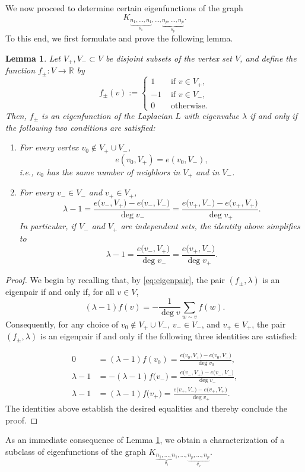 \documentclass{article}
\theoremstyle{plain}
\newtheorem{lemma}[theorem]{Lemma}
\theoremstyle{definition}
\theoremstyle{remark}
\begin{document}
We now proceed to determine certain eigenfunctions of the graph
\[
K_{\underbrace{n_1, \ldots, n_1}_{\theta_1}, \ldots, \underbrace{n_p, \ldots, n_p}_{\theta_p}}.
\]
To this end, we first formulate and prove the following lemma.

\begin{lemma}\label{lem:plusminus}
Let $V_+,V_-\subset V$ be disjoint subsets of the vertex set $V$, and define the function $f_{\pm}:V\to\mathbb{R}$ by
\[
    f_{\pm}(v) := \begin{cases}
        1 &\text{ if } v\in V_+,\\
        -1 &\text{ if } v\in V_-,\\
        0 &\text{ otherwise.}
    \end{cases}
\]
Then, $f_{\pm}$ is an eigenfunction of the Laplacian $L$ with eigenvalue $\lambda$ if and only if the following two conditions are satisfied:
\begin{enumerate}
    \item For every vertex $v_0\notin V_+\cup V_-$,
    \[
        e(v_0,V_+) = e(v_0,V_-),
    \]
    i.e., $v_0$ has the same number of neighbors in $V_+$ and in $V_-$.
    \item For every $v_-\in V_-$ and $v_+\in V_+$,
    \[
        \lambda-1
        = \frac{e\bigl(v_-,V_+\bigr)-e\bigl(v_-,V_-\bigr)}{\deg v_-}
        = \frac{e\bigl(v_+,V_-\bigr)-e\bigl(v_+,V_+\bigr)}{\deg v_+}.
    \]
    In particular, if $V_-$ and $V_+$ are independent sets, the identity above simplifies to
    \[
        \lambda-1 = \frac{e\bigl(v_-,V_+\bigr)}{\deg v_-}
        = \frac{e\bigl(v_+,V_-\bigr)}{\deg v_+}.
    \]
\end{enumerate}
\end{lemma}
\begin{proof}
    We begin by recalling that, by \eqref{eq:eigenpair}, the pair $(f_{\pm},\lambda)$ is an eigenpair if and only if, for all $v\in V$,
    \[
    (\lambda-1)f(v) = -\frac1{\deg v}\sum_{w\sim v}f(w).
    \]
    Consequently, for any choice of $v_0\notin V_+\cup V_-$, $v_-\in V_-$, and $v_+\in V_+$, the pair $(f_{\pm},\lambda)$ is an eigenpair if and only if the following three identities are satisfied:

    \begin{align*}
        0 &= (\lambda-1)f(v_0) = \frac{e\bigl(v_0,V_+\bigr) - e\bigl(v_0,V_-\bigr)}{\deg v_0},\\
        \lambda-1 &= -(\lambda-1)f\bigl(v_-\bigr) = \frac{e\bigl(v_-,V_+\bigr) - e\bigl(v_-,V_-\bigr)}{\deg v_-},\\
        \lambda-1 &= (\lambda-1)f\bigl(v_+\bigr) = \frac{e\bigl(v_+,V_-\bigr) - e\bigl(v_+,V_+\bigr)}{\deg v_+}.
    \end{align*}
    The identities above establish the desired equalities and thereby conclude the proof.
\end{proof}
As an immediate consequence of Lemma \ref{lem:plusminus}, we obtain a characterization of a subclass of eigenfunctions of the graph $K_{\underbrace{n_1, \ldots, n_1}_{\theta_1}, \ldots, \underbrace{n_p, \ldots, n_p}_{\theta_p}}$.
\end{document}
